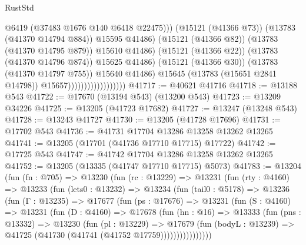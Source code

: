 \begin{lexlean}{RustStd}
\begin{coremodule}
                                                    @6419
                                                    (@37483 @1676 @140 @6418 @22475)))
                                                (@15121 (@41366 @73))
                                                (@13783 (@41370 @14794 @884))
                                                @15595
                                                @41486)
                                              (@15121 (@41366 @82))
                                              (@13783 (@41370 @14795 @879))
                                              @15610
                                              @41486)
                                            (@15121 (@41366 @22))
                                            (@13783 (@41370 @14796 @874))
                                            @15625
                                            @41486)
                                          (@15121 (@41366 @30))
                                          (@13783 (@41370 @14797 @755))
                                          @15640
                                          @41486)
                                        @15645
                                        (@13783 (@15651 @2841 @14798))
                                        @15657))))))))))))))))))
@41717 := @40621 @41716
@41718 := @13188 @543
@41722 := @17670 (@13194 @543) (@13200 @543)
@41723 := @13209 @34226
@41725 := @13205 (@41723 @17682)
@41727 := @13247 (@13248 @543)
@41728 := @13243 @41727
@41730 := @13205 (@41728 @17696)
@41731 := @17702 @543
@41736 := @41731 @17704 @13286 @13258 @13262 @13265
@41741 := @13205 (@17701 (@41736 @17710 @17715) @17722)
@41742 := @17725 @543
@41747 := @41742 @17704 @13286 @13258 @13262 @13265
@41752 := @13205 (@13335 (@41747 @17710 @17715) @5073)
@41783 := @13204
    (fun (fn : @705) =>
    @13230
      (fun (rc : @13229) =>
      @13231
        (fun (rty : @4160) =>
        @13233
          (fun (lets0 : @13232) =>
          @13234
            (fun (tail0 : @5178) =>
            @13236
              (fun (Γ : @13235) =>
              @17677
                (fun (ps : @17676) =>
                @13231
                  (fun (S : @4160) =>
                  @13231
                    (fun (D : @4160) =>
                    @17678
                      (fun (hn : @16) =>
                      @13333
                        (fun (pns : @13332) =>
                        @13230
                          (fun (pl : @13229) =>
                          @17679
                            (fun (bodyL : @13239) =>
                            @41725 (@41730 (@41741 (@41752 @17759))))))))))))))))

\end{coremodule}
\end{lexlean}

